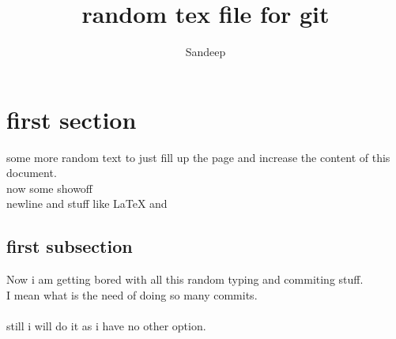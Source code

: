 \documentclass {article}
\author {Sandeep}
\title {random tex file for git}
\begin{document}
\maketitle
\section{first section}
some more random text to just fill up the page and increase the content of this document.\\
now some showoff\cite{sandu} \\
newline and stuff like \LaTeX{} and \cite{sandbook}

\subsection{first subsection}
Now i am getting bored with all this random typing and commiting stuff.\\
I mean what is the need of doing so many commits.\\ \\
still i will do it as i have no other option.



\end{document}
